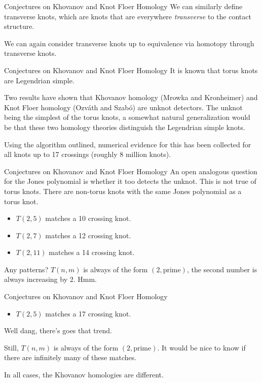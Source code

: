 \documentclass{beamer}
\begin{document}
    \begin{frame}{Conjectures on Khovanov and Knot Floer Homology}
        We can similarly define transverse knots, which are knots that are
        everywhere \textit{transverse} to the contact structure.
        \par\hfill\par
        We can again consider transverse knots up to equivalence via homotopy
        through transverse knots.
    \end{frame}
    \begin{frame}{Conjectures on Khovanov and Knot Floer Homology}
        It is known that torus knots are Legendrian simple.
        \par\hfill\par
        Two results have shown that Khovanov homology (Mrowka and Kronheimer)
        and Knot Floer homology (Ozv\'{a}th and Szab\'{o}) are unknot detectors.
        The unknot being the simplest of the torus knots, a somewhat natural
        generalization would be that these two homology theories
        distinguish the Legendrian simple knots.
        \par\hfill\par
        Using the algorithm outlined, numerical evidence for this has been
        collected for all knots up to 17 crossings (roughly 8 million knots).
    \end{frame}
    \begin{frame}{Conjectures on Khovanov and Knot Floer Homology}
        An open analogous question for the Jones polynomial is whether it too
        detects the unknot. This is not true of torus knots. There are
        non-torus knots with the same Jones polynomial as a torus knot.
        \begin{itemize}
            \item $T(2,5)$ matches a 10 crossing knot.
            \item $T(2,7)$ matches a 12 crossing knot.
            \item $T(2,11)$ matches a 14 crossing knot.
        \end{itemize}
        Any patterns? $T(n,m)$ is always of the form $(2,\text{prime})$,
        the second number is always increasing by 2. Hmm.
    \end{frame}
    \begin{frame}{Conjectures on Khovanov and Knot Floer Homology}
        \begin{itemize}
            \item $T(2,5)$ matches a 17 crossing knot.
        \end{itemize}
        Well dang, there's goes that trend.
        \par\hfill\par
        Still, $T(n,m)$ is always of the form $(2,\text{prime})$. It would
        be nice to know if there are infinitely many of these matches.
        \par\hfill\par
        In all cases, the Khovanov homologies are different.
    \end{frame}
\end{document}
